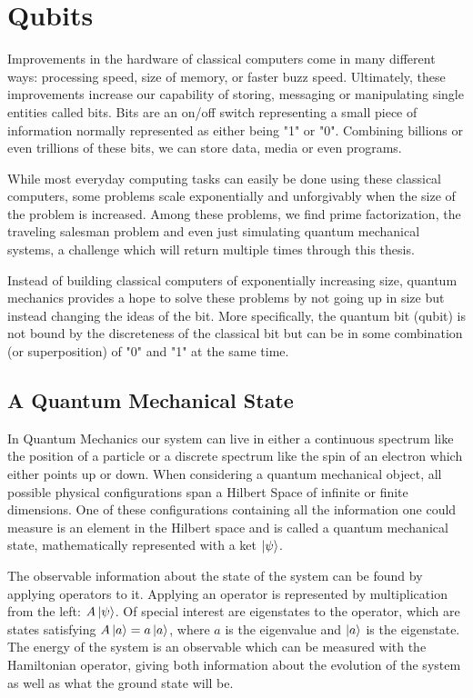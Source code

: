 \section{Qubits}
Improvements in the hardware of classical computers come in many different ways: processing speed, size of memory, or faster buzz speed. Ultimately, these improvements increase our capability of storing, messaging or manipulating single entities called bits. Bits are an on/off switch representing a small piece of information normally represented as either being "1" or "0". Combining billions or even trillions of these bits, we can store data, media or even programs.

While most everyday computing tasks can easily be done using these classical computers, some problems scale exponentially and unforgivably when the size of the problem is increased. Among these problems, we find prime factorization, the traveling salesman problem and even just simulating quantum mechanical systems, a challenge which will return multiple times through this thesis.

Instead of building classical computers of exponentially increasing size, quantum mechanics provides a hope to solve these problems by not going up in size but instead changing the ideas of the bit. More specifically, the quantum bit (qubit) is not bound by the discreteness of the classical bit but can be in some combination (or superposition) of "0" and "1" at the same time. 

\subsection{A Quantum Mechanical State}
In Quantum Mechanics our system can live in either a continuous spectrum like the position of a particle or a discrete spectrum like the spin of an electron which either points up or down. When considering a quantum mechanical object, all possible physical configurations span a Hilbert Space of infinite or finite dimensions. One of these configurations containing all the information one could measure is an element in the Hilbert space and is called a quantum mechanical state, mathematically represented with a ket $\ket{\psi}$. \cite{sakurai_modern_2021}

The observable information about the state of the system can be found by applying operators to it. Applying an operator is represented by multiplication from the left: $A\ket{\psi}$. Of special interest are eigenstates to the operator, which are states satisfying $A\ket{a} = a \ket{a}$, where $a$ is the eigenvalue and $\ket{a}$ is the eigenstate. The energy of the system is an observable which can be measured with the Hamiltonian operator, giving both information about the evolution of the system as well as what the ground state will be. \cite{sakurai_modern_2021}

